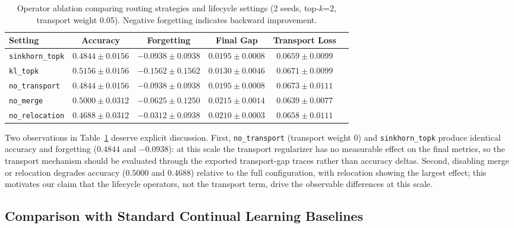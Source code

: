 \documentclass[11pt,a4paper]{article}
\theoremstyle{definition}
\begin{document}
\begin{table}[t]
\centering
\caption{Operator ablation comparing routing strategies and lifecycle settings (2 seeds, top-$k$=2, transport weight 0.05). Negative forgetting indicates backward improvement.}
\label{tab:operator_ablation}
\begin{tabular}{lccccc}
\toprule
\textbf{Setting} & \textbf{Accuracy} & \textbf{Forgetting} & \textbf{Final Gap} & \textbf{Transport Loss} \\
\midrule
\texttt{sinkhorn\_topk} & $0.4844 \pm 0.0156$ & $-0.0938 \pm 0.0938$ & $0.0195 \pm 0.0008$ & $0.0659 \pm 0.0099$ \\
\texttt{kl\_topk} & $\mathbf{0.5156} \pm \mathbf{0.0156}$ & $\mathbf{-0.1562} \pm \mathbf{0.1562}$ & $0.0130 \pm 0.0046$ & $0.0671 \pm 0.0099$ \\
\texttt{no\_transport} & $0.4844 \pm 0.0156$ & $-0.0938 \pm 0.0938$ & $0.0195 \pm 0.0008$ & $0.0673 \pm 0.0111$ \\
\texttt{no\_merge} & $0.5000 \pm 0.0312$ & $-0.0625 \pm 0.1250$ & $0.0215 \pm 0.0014$ & $0.0639 \pm 0.0077$ \\
\texttt{no\_relocation} & $0.4688 \pm 0.0312$ & $-0.0312 \pm 0.0938$ & $0.0210 \pm 0.0003$ & $0.0658 \pm 0.0111$ \\
\bottomrule
\end{tabular}
\end{table}

Two observations in Table~\ref{tab:operator_ablation} deserve explicit discussion. First, \texttt{no\_transport} (transport weight $0$) and \texttt{sinkhorn\_topk} produce identical accuracy and forgetting ($0.4844$ and $-0.0938$): at this scale the transport regularizer has no measurable effect on the final metrics, so the transport mechanism should be evaluated through the exported transport-gap traces rather than accuracy deltas. Second, disabling merge or relocation degrades accuracy ($0.5000$ and $0.4688$) relative to the full configuration, with relocation showing the largest effect; this motivates our claim that the lifecycle operators, not the transport term, drive the observable differences at this scale.

\subsection{Comparison with Standard Continual Learning Baselines}
\end{document}
